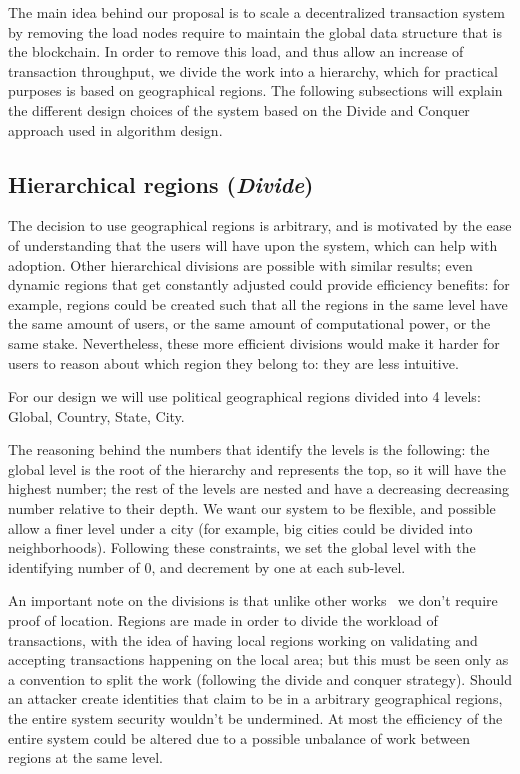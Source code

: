The main idea behind our proposal is to scale a decentralized transaction
system by removing the load nodes require to maintain the global data structure
that is the blockchain.  In order to remove this load, and thus allow an
increase of transaction throughput, we divide the work into a hierarchy,
which for practical purposes is based on geographical regions.  The following
subsections will explain the different design choices of the system based on
the Divide and Conquer approach used in algorithm design.

\subsection{Hierarchical regions (\textit{Divide})}

The decision to use geographical regions is arbitrary, and is motivated by the
ease of understanding that the users will have upon the system, which can help
with adoption.  Other hierarchical divisions are possible with similar results;
even dynamic regions that get constantly adjusted could provide efficiency
benefits: for example, regions could be created such that all the regions in
the same level have the same amount of users, or the same amount of
computational power, or the same stake.  Nevertheless, these more efficient
divisions would make it harder for users to reason about which region they
belong to: they are less intuitive.

For our design we will use political geographical regions divided into 4
levels: Global, Country, State, City.

The reasoning behind the numbers that identify the levels is the following: the
global level is the root of the hierarchy and represents the top, so it will
have the highest number; the rest of the levels are nested and have a
decreasing decreasing number relative to their depth.  We want our system to be
flexible, and possible allow a finer level under a city (for example, big
cities could be divided into neighborhoods).  Following these constraints, we
set the global level with the identifying number of 0, and decrement by one at
each sub-level.

An important note on the divisions is that unlike other
works~\cite{unchain} we don't require proof of location.  Regions are made
in order to divide the workload of transactions, with the idea of having local
regions working on validating and accepting transactions happening on the local
area; but this must be seen only as a convention to split the work (following
the divide and conquer strategy).  Should an attacker create identities that
claim to be in a arbitrary geographical regions, the entire system security
wouldn't be undermined.  At most the efficiency of the entire system could be
altered due to a possible unbalance of work between regions at the same level.

